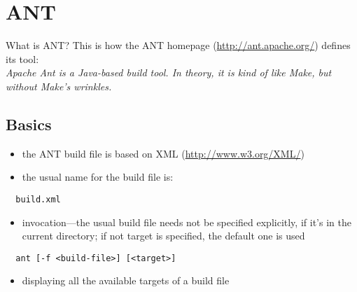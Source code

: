 %
%
%
%


\section{ANT}

What is ANT? This is how the ANT homepage (\url{http://ant.apache.org/}{}) defines its tool:\\

\noindent \emph{Apache Ant is a Java-based build tool. In theory, it is kind of like Make, but without Make's wrinkles.}

\subsection{Basics}

\begin{itemize}
\item the ANT build file is based on XML (\url{http://www.w3.org/XML/}{})
\item the usual name for the build file is:
\end{itemize}

\verb=  build.xml=

\begin{itemize}
\item invocation---the usual build file needs not be specified explicitly, if it's in the current directory; if not target is specified, the default one is used
\end{itemize}

\verb=  ant [-f <build-file>] [<target>]=

\begin{itemize}
\item displaying all the available targets of a build file
\end{itemize}


